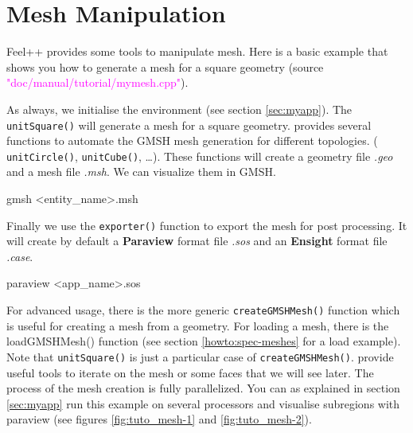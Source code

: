 %


\section{Mesh Manipulation}
\label{sec:mymesh}

Feel++ provides some tools to manipulate mesh. 
Here is a basic example that shows
you how to generate a mesh for a square geometry
(source \textcolor{magenta}{"doc/manual/tutorial/mymesh.cpp"}).
%
\vspace{2mm}

\vspace{2mm}

As always, we initialise the \feel environment (see section \ref{sec:myapp}).
The \lstinline!unitSquare()! will generate a mesh for a square geometry.
\feel provides several functions to automate the GMSH mesh generation
for different topologies.
%
( \lstinline!unitCircle()!,
  \lstinline!unitCube()!,
  \dots ).
%
These functions will create a geometry file
\textit{.geo} and a mesh file \textit{.msh}. We can visualize them in GMSH. 
%
\begin{unixcom}
    gmsh <entity_name>.msh
\end{unixcom}
%
Finally we use the \lstinline!exporter()! function to export the mesh for post processing.
It will create by default a \textbf{Paraview} format file \textit{.sos} and an \textbf{Ensight}
format file \textit{.case}.
%
\begin{unixcom}
    paraview <app_name>.sos
\end{unixcom}
%
For advanced usage, there is the more generic \lstinline!createGMSHMesh()! function which is
useful for creating a mesh from a geometry. For loading a mesh, there is the loadGMSHMesh() function
(see section \ref{howto:spec-meshes} for a load example).
Note that \lstinline!unitSquare()! is just a particular case of \lstinline!createGMSHMesh()!.
\feel provide useful tools to iterate on the mesh or some faces that we will see later.
%
The process of the mesh creation is fully parallelized. You can as explained in section \ref{sec:myapp}
run this example on several processors and visualise subregions with paraview (see figures 
\ref{fig:tuto_mesh-1} and \ref{fig:tuto_mesh-2}).


